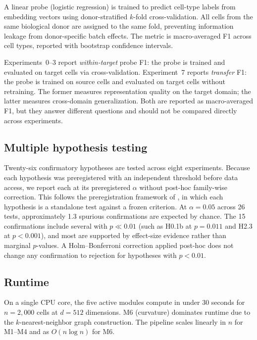 \documentclass[11pt,letterpaper]{article}
\begin{document}
A linear probe (logistic regression) is trained to predict cell-type labels from embedding vectors using donor-stratified $k$-fold cross-validation. All cells from the same biological donor are assigned to the same fold, preventing information leakage from donor-specific batch effects. The metric is macro-averaged F1 across cell types, reported with bootstrap confidence intervals.

Experiments~0--3 report \emph{within-target} probe F1: the probe is trained and evaluated on target cells via cross-validation. Experiment~7 reports \emph{transfer} F1: the probe is trained on source cells and evaluated on target cells without retraining. The former measures representation quality on the target domain; the latter measures cross-domain generalization. Both are reported as macro-averaged F1, but they answer different questions and should not be compared directly across experiments.

\subsection{Multiple hypothesis testing}

Twenty-six confirmatory hypotheses are tested across eight experiments. Because each hypothesis was preregistered with an independent threshold before data access, we report each at its preregistered $\alpha$ without post-hoc family-wise correction. This follows the preregistration framework of \citet{nosek2018preregistration}, in which each hypothesis is a standalone test against a frozen criterion. At $\alpha = 0.05$ across 26 tests, approximately 1.3 spurious confirmations are expected by chance. The 15 confirmations include several with $p \ll 0.01$ (such as H0.1b at $p = 0.011$ and H2.3 at $p < 0.001$), and most are supported by effect-size evidence rather than marginal $p$-values. A Holm--Bonferroni correction applied post-hoc does not change any confirmation to rejection for hypotheses with $p < 0.01$.

\subsection{Runtime}

On a single CPU core, the five active modules compute in under 30 seconds for $n = 2{,}000$ cells at $d = 512$ dimensions. M6 (curvature) dominates runtime due to the $k$-nearest-neighbor graph construction. The pipeline scales linearly in $n$ for M1--M4 and as $O(n \log n)$ for M6.
\end{document}
